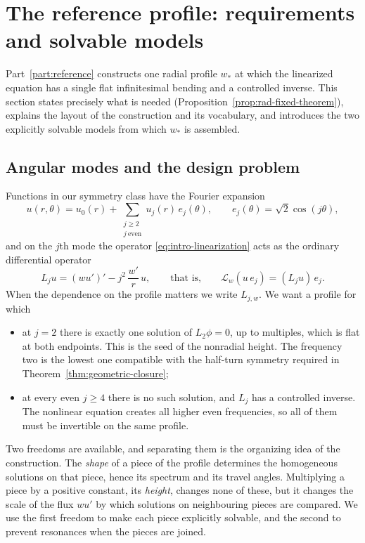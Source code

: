 \section{The reference profile: requirements and solvable models}
\label{sec:rosen-reference-packet}
\label{sec:radial-models}

Part~\ref{part:reference} constructs one radial profile $w_*$ at which
the linearized equation has a single flat infinitesimal bending and a
controlled inverse. This section states precisely what is needed
(Proposition~\ref{prop:rad-fixed-theorem}), explains the layout of the
construction and its vocabulary, and introduces the two explicitly
solvable models from which $w_*$ is assembled.

\subsection{Angular modes and the design problem}

Functions in our symmetry class have the Fourier expansion
\[
 u(r,\theta)=u_0(r)+\sum_{\substack{j\ge2\\ j\ \mathrm{even}}}
 u_j(r)\,e_j(\theta),
 \qquad e_j(\theta)=\sqrt2\cos(j\theta),
\]
and on the $j$th mode the operator \eqref{eq:intro-linearization} acts
as the ordinary differential operator
\begin{equation}\label{eq:rad-eq-modal-operator}
 L_ju=(wu')'-j^2\,\frac{w'}r\,u,
 \qquad\text{that is,}\qquad
 \mathscr L_w(u\,e_j)=(L_ju)\,e_j .
\end{equation}
When the dependence on the profile matters we write $L_{j,w}$. We want
a profile for which
\begin{itemize}
\item at $j=2$ there is exactly one solution of $L_2\phi=0$, up to
 multiples, which is flat at both endpoints. This is the seed of the
 nonradial height. The frequency two is the lowest one compatible with
 the half-turn symmetry required in
 Theorem~\ref{thm:geometric-closure};
\item at every even $j\ge4$ there is no such solution, and $L_j$ has a
 controlled inverse. The nonlinear equation creates all higher even
 frequencies, so all of them must be invertible on the same profile.
\end{itemize}

Two freedoms are available, and separating them is the organizing idea
of the construction. The \emph{shape} of a piece of the profile
determines the homogeneous solutions on that piece, hence its spectrum
and its travel angles. Multiplying a piece by a positive constant, its
\emph{height}, changes none of these, but it changes the scale of the
flux $wu'$ by which solutions on neighbouring pieces are compared. We
use the first freedom to make each piece explicitly solvable, and the
second to prevent resonances when the pieces are joined.

